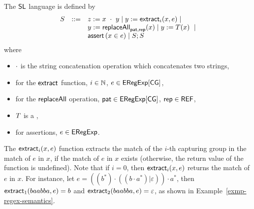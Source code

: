 The $\mathsf{SL}$ language is defined by
\[
\begin{array}{l c l}
S &::= &  z:= x\ \cdot\ y \mid y := \mathsf{extract}_i(x,e) \mid  \\ 
& &  
y := \mathsf{replaceAll}_{\mathsf{pat}, \mathsf{rep}}(x)   \mid y := T(x)\  \mid\\
& & \text{$\textsf{assert}\left(x \in e\right)$} \mid S; S\
\label{eq:SL}
\end{array}
\]
where 
\begin{itemize}
	\item $\cdot$ is the string concatenation operation which concatenates two strings,
%
\item for the $\mathsf{extract}$ function, $i \in \mathbb{N}$, $e \in {\sf ERegExp}[\sf CG]$,
%
	\item  for the $\mathsf{replaceAll}$ operation, $\mathsf{pat}\in {\sf ERegExp}[\sf CG]$, $\mathsf{rep} \in {\sf REF}$, %
	\item $T$ is a \PSST,
%
	\item for assertions, $e \in {\sf ERegExp}$.
\end{itemize} 
%
%


%

The $\mathsf{extract}_i(x, e)$ function extracts the match of the $i$-th capturing group in the match of $e$ in $x$, if the match of $e$ in $x$ exists (otherwise, the return value of the function is undefined). Note that if $i=0$, then $\mathsf{extract}_i(x, e)$ returns the match of $e$ in $x$. For instance, let $e = ((b^\ast) \cdot ((b \cdot a^\ast) | \varepsilon)) \cdot a^\ast$, then $\mathsf{extract}_1(baabba, e)=b$ and $\mathsf{extract}_2(baabba, e)=\varepsilon$, as shown in Example~\ref{exmp-regex-semantics}.

